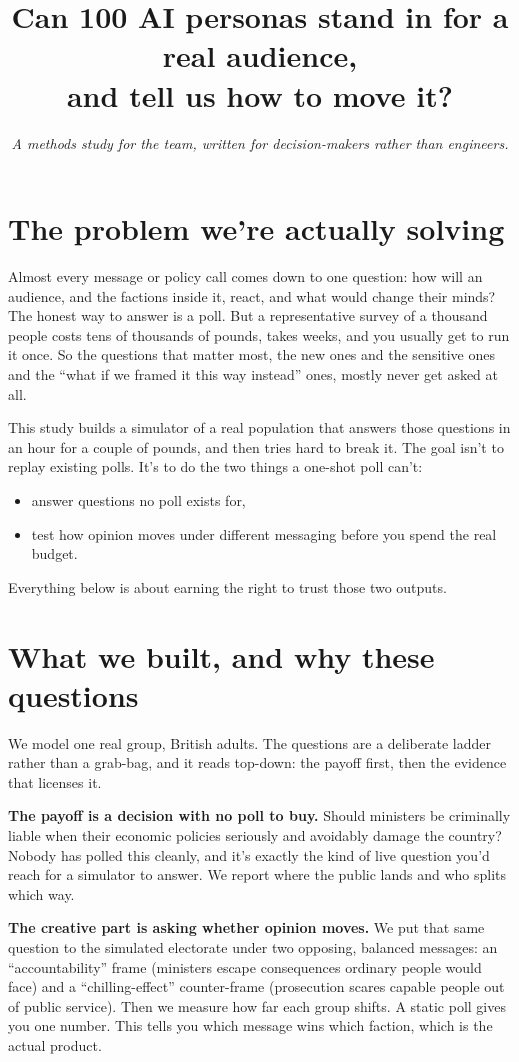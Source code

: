 \documentclass[11pt]{article}
\title{\vspace{-1.5em}Can 100 AI personas stand in for a real audience,\\ and tell us how to move it?}
\author{}
\date{\vspace{-1em}\textit{A methods study for the team, written for decision-makers rather than engineers.}}
\begin{document}
\maketitle
\vspace{-2em}

\section*{The problem we're actually solving}

Almost every message or policy call comes down to one question: how will an
audience, and the factions inside it, react, and what would change their minds?
The honest way to answer is a poll. But a representative survey of a thousand
people costs tens of thousands of pounds, takes weeks, and you usually get to run
it once. So the questions that matter most, the new ones and the sensitive ones and
the ``what if we framed it this way instead'' ones, mostly never get asked at all.

This study builds a simulator of a real population that answers those questions in
an hour for a couple of pounds, and then tries hard to break it. The goal isn't to
replay existing polls. It's to do the two things a one-shot poll can't:
\begin{itemize}
  \item answer questions no poll exists for,
  \item test how opinion moves under different messaging before you spend the real budget.
\end{itemize}
Everything below is about earning the right to trust those two outputs.

\section*{What we built, and why these questions}

We model one real group, British adults. The questions are a deliberate ladder
rather than a grab-bag, and it reads top-down: the payoff first, then the evidence
that licenses it.

\textbf{The payoff is a decision with no poll to buy.} Should ministers be
criminally liable when their economic policies seriously and avoidably damage the
country? Nobody has polled this cleanly, and it's exactly the kind of live question
you'd reach for a simulator to answer. We report where the public lands and who
splits which way.

\textbf{The creative part is asking whether opinion moves.} We put that same
question to the simulated electorate under two opposing, balanced messages: an
``accountability'' frame (ministers escape consequences ordinary people would face)
and a ``chilling-effect'' counter-frame (prosecution scares capable people out of
public service). Then we measure how far each group shifts. A static poll gives you
one number. This tells you which message wins which faction, which is the actual
product.
\end{document}
